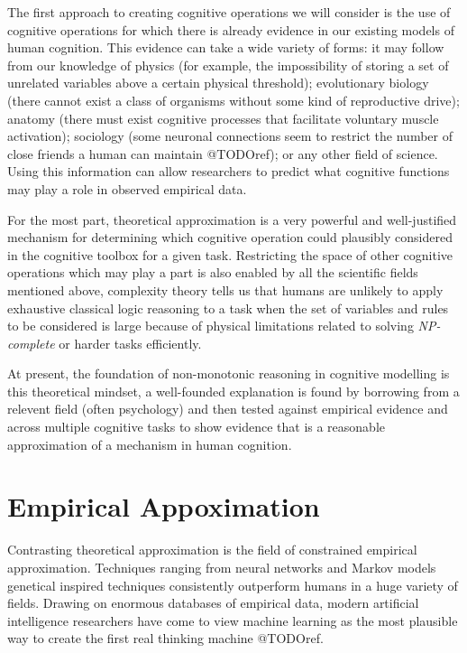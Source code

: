 \documentclass[
11pt, %
english, %
singlespacing, %
headsepline, %
]{MastersDoctoralThesis} %
\begin{document}
The first approach to creating cognitive operations we will consider is the use of cognitive operations for which there is already evidence in our existing models of human cognition. This evidence can take a wide variety of forms: it may follow from our knowledge of physics (for example, the impossibility of storing a set of unrelated variables above a certain physical threshold); evolutionary biology (there cannot exist a class of organisms without some kind of reproductive drive); anatomy (there must exist cognitive processes that facilitate voluntary muscle activation); sociology (some neuronal connections seem to restrict the number of close friends a human can maintain @TODOref); or any other field of science. Using this information can allow researchers to predict what cognitive functions may play a role in observed empirical data. 

For the most part, theoretical approximation is a very powerful and well-justified mechanism for determining which cognitive operation could plausibly considered in the cognitive toolbox for a given task. Restricting the space of other cognitive operations which may play a part is also enabled by all the scientific fields mentioned above, complexity theory tells us that humans are unlikely to apply exhaustive classical logic reasoning to a task when the set of variables and rules to be considered is large because of physical limitations related to solving \textit{NP-complete} or harder tasks efficiently.

At present, the foundation of non-monotonic reasoning in cognitive modelling is this theoretical mindset, a well-founded explanation is found by borrowing from a relevent field (often psychology) and then tested against empirical evidence and across multiple cognitive tasks to show evidence that is a reasonable approximation of a mechanism in human cognition.


\section{Empirical Appoximation}
Contrasting theoretical approximation is the field of constrained empirical approximation. Techniques ranging from neural networks and Markov models genetical inspired techniques consistently outperform humans in a huge variety of fields. Drawing on enormous databases of empirical data, modern artificial intelligence researchers have come to view machine learning as the most plausible way to create the first real thinking machine @TODOref.
\end{document}
